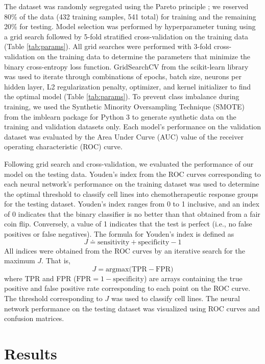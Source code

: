 \documentclass[10pt, letterpaper, twocolumn]{article}
\begin{document}
The dataset was randomly segregated using the Pareto principle \cite{pareto}; we reserved 80\% of the data (432 training samples, 541 total) for training and the remaining 20\% for testing. Model selection was performed by hyperparameter tuning using a grid search followed by 5-fold stratified cross-validation on the training data (Table \ref{tab:params}). All grid searches were performed with 3-fold cross-validation on the training data to determine the parameters that minimize the binary cross-entropy loss function. GridSearchCV from the scikit-learn library \cite{scikit-learn} was used to iterate through combinations of epochs, batch size, neurons per hidden layer, L2 regularization penalty, optimizer, and kernel initializer to find the optimal model (Table \ref{tab:params}). To prevent class imbalance during training, we used the Synthetic Minority Oversampling Technique (SMOTE) from the imblearn package \cite{imblearn} for Python 3 to generate synthetic data on the training and validation datasets only. Each model’s performance on the validation dataset was evaluated by the Area Under Curve (AUC) value of the receiver operating characteristic (ROC) curve.

Following grid search and cross-validation, we evaluated the performance of our model on the testing data. Youden's index from the ROC curves corresponding to each neural network’s performance on the training dataset was used to determine the optimal threshold to classify cell lines into chemotherapeutic response groups for the testing dataset. Youden’s index ranges from 0 to 1 inclusive, and an index of 0 indicates that the binary classifier is no better than that obtained from a fair coin flip. Conversely, a value of 1 indicates that the test is perfect (i.e., no false positives or false negatives). The formula for Youden's index is defined as $$J \doteq \text{sensitivity} + \text{specificity} - 1$$ All indices were obtained from the ROC curves by an iterative search for the maximum $J$. That is, $$J = \text{argmax(TPR} - \text{FPR)}$$ where TPR and FPR ($\text{FPR} = 1 - \text{specificity}$) are arrays containing the true positive and false positive rate corresponding to each point on the ROC curve. The threshold corresponding to $J$ was used to classify cell lines. The neural network performance on the testing dataset was visualized using ROC curves and confusion matrices.


\section{Results}
\end{document}
